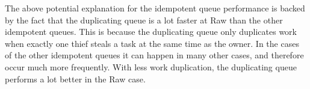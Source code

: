 The above potential explanation for the idempotent queue performance is backed by the fact that the duplicating queue is a lot faster at Raw than the other idempotent queues. This is because the duplicating queue only duplicates work when exactly one thief steals a task at the same time as the owner. In the cases of the other idempotent queues it can happen in many other cases, and therefore occur much more frequently. With less work duplication, the duplicating queue performs a lot better in the Raw case.